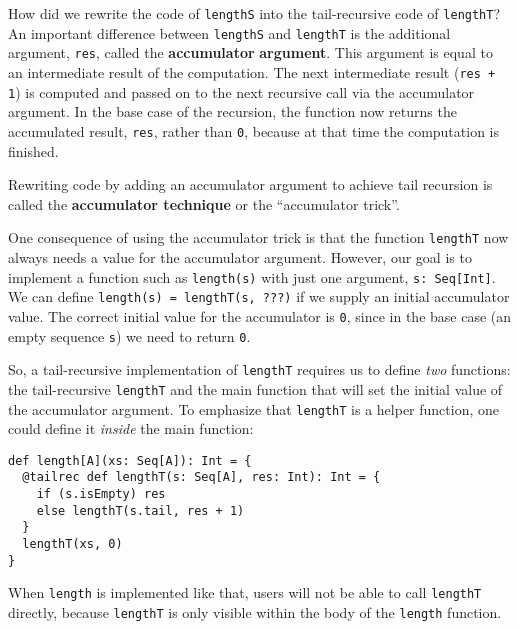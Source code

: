How did we rewrite the code of \lstinline!lengthS! into the tail-recursive
code of \lstinline!lengthT!? An important difference between \lstinline!lengthS!
and \lstinline!lengthT! is the additional argument, \lstinline!res!,
called the \textbf{accumulator}
\textbf{argument}. This argument is equal to an intermediate result
of the computation. The next intermediate result (\lstinline!res + 1!)
is computed and passed on to the next recursive call via the accumulator
argument. In the base case of the recursion, the function now returns
the accumulated result, \lstinline!res!, rather than \lstinline!0!,
because at that time the computation is finished.

Rewriting code by adding an accumulator argument to achieve tail recursion
is called the \textbf{accumulator technique} or the \textsf{``}accumulator
trick\textsf{''}.

One consequence of using the accumulator trick is that the function
\lstinline!lengthT! now always needs a value for the accumulator
argument. However, our goal is to implement a function such as \lstinline!length(s)!
with just one argument, \lstinline!s: Seq[Int]!. We can define \lstinline!length(s) = lengthT(s, ???)!
if we supply an initial accumulator value. The correct initial value
for the accumulator is \lstinline!0!, since in the base case (an
empty sequence \lstinline!s!) we need to return \lstinline!0!.

So, a tail-recursive implementation of \lstinline!lengthT! requires
us to define \emph{two} functions: the tail-recursive \lstinline!lengthT!
and the main function that will set the initial value of the accumulator
argument. To emphasize that \lstinline!lengthT! is a helper function,
one could define it \emph{inside} the main function:
\begin{lstlisting}
def length[A](xs: Seq[A]): Int = {
  @tailrec def lengthT(s: Seq[A], res: Int): Int = {
    if (s.isEmpty) res
    else lengthT(s.tail, res + 1)
  }
  lengthT(xs, 0)
}
\end{lstlisting}
When \lstinline!length! is implemented like that, users will not
be able to call \lstinline!lengthT! directly, because \lstinline!lengthT!
is only visible within the body of the \lstinline!length! function.

